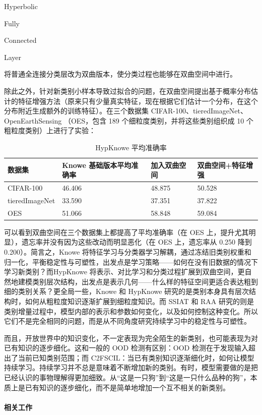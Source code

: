 Hyperbolic

Fully

Connected

Layer

将普通全连接分类层改为双曲版本，使分类过程也能够在双曲空间中进行。

除此之外，针对新类别小样本导致过拟合的问题，在双曲空间提出基于概率分布估计的特征增强方法（原来只有少量真实特征，现在根据它们估计一个分布，在这个分布附近生成额外的训练特征）。在三个数据集 CIFAR-100、tieredImageNet、OpenEarthSensing （OES，包含 189 个细粒度类别，并将这些类别组织成 10 个粗粒度类别）上进行了实验：

\begin{table}[H]\centering
\caption*{HypKnowe 平均准确率}
\begin{tabular}{llll}\toprule
\textbf{数据集} & \textbf{Knowe 基础版本平均准确率} & \textbf{加入双曲空间} & \textbf{双曲空间+特征增强} \\ \midrule
CIFAR-100 & 46.406 & 48.875 & 50.528 \\
tieredImageNet & 33.590 & 37.351 & 37.822 \\
OES & 51.066 & 58.848 & 59.084 \\
\bottomrule\end{tabular}
\end{table}

可以看到双曲空间在三个数据集上都提高了平均准确率（在 OES 上，提升尤其明显），遗忘率并没有因为这些改动而明显恶化（在 OES 上，遗忘率从 0.250 降到 0.200）。简言之，Knowe 将特征学习与分类器学习解耦，通过冻结旧类别权重和归一化，平衡稳定性与可塑性，出发点是学习策略——如何在没有旧数据的情况下学习新类别？而HypKnowe 将表示、对比学习和分类过程扩展到双曲空间，更自然地建模类别层次结构，出发点是表示几何——什么样的特征空间更适合表达粗到细的类别关系？更全局一些，Knowe 和 HypKnowe 研究的是类别本身具有层次结构时，如何从粗粒度知识逐渐扩展到细粒度知识。而 SSIAT 和 RAA 研究的则是类别增量过程中，模型内部的表示和参数如何变化，以及如何控制这种变化。所以它们不是完全相同的问题，而是从不同角度研究持续学习中的稳定性与可塑性。

而且，开放世界中的知识变化，不一定表现为完全陌生的新类别，也可能表现为对已有知识的逐步细化。这和一般的 OOD 检测有区别：OOD 检测在于发现输入超出了当前已知类别范围；而 C2FSCIL：当已有类别知识逐渐细化时，如何让模型持续学习。持续学习并不总是意味着不断增加新的类别。有时，模型需要做的是把已经认识的事物理解得更加细致。从“这是一只狗”到“这是一只什么品种的狗”，本质上是已有知识的逐步细化，而不是简单地增加一个互不相关的新类别。

\paragraph{相关工作}

